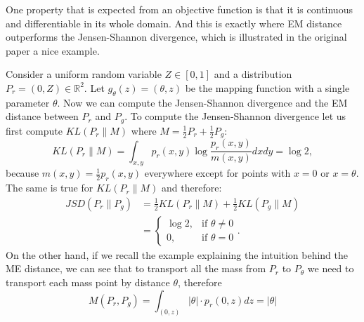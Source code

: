 One property that is expected from an objective function is that it is continuous and differentiable in its whole domain. And this is exactly where EM distance outperforms the Jensen-Shannon divergence, which is illustrated in the original paper a nice example. 

Consider a uniform random variable $Z \in [0, 1]$ and a distribution $P_r = (0, Z) \in \mathbb{R}^2$. Let $g_\theta(z) = (\theta, z)$ be the mapping function with a single parameter $\theta$. Now we can compute the Jensen-Shannon divergence and the EM distance between $P_r$ and $P_g$. 
To compute the Jensen-Shannon divergence let us first compute $KL(P_r \lVert M)$ where $M = \frac{1}{2}P_r + \frac{1}{2}P_g$:
\begin{equation}
	KL(P_r \lVert M) = \int_{x,y} p_r(x,y) \log \frac{p_r(x,y)}{m(x,y)} dxdy = \log2,
\end{equation}
because $m(x,y) = \frac{1}{2} p_r(x,y)$ everywhere except for points with $x=0$ or $x=\theta$. The same is true for $KL(P_r \lVert M)$ and therefore:
\begin{align*}
 JSD(P_r \lVert P_g) &= \frac{1}{2}KL(P_r \lVert M) + \frac{1}{2}KL(P_g\lVert M) \\ 
 	&= \begin{cases}
 		\log2, & \text{if } \theta \neq 0 \\
 		0, & \text{if } \theta = 0
 	\end{cases}.
\end{align*}  
On the other hand, if we recall the example explaining the intuition behind the ME distance, we can see that to transport all the mass from $P_r$ to $P_\theta$ we need to transport each mass point by distance $\theta$, therefore
\begin{equation}
	M(P_r, P_g) = \int_{(0,z)} |\theta| \cdot p_r(0,z)dz = |\theta|
\end{equation}

